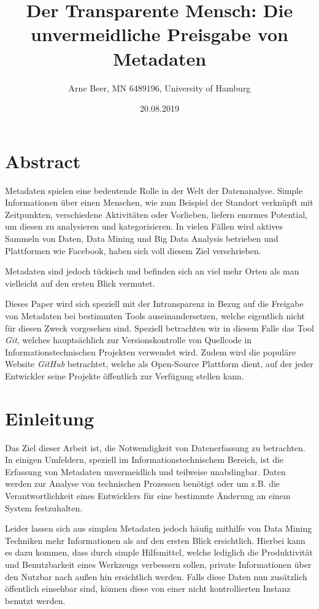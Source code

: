 \documentclass[12pt,a4paper]{scrartcl}
\begin{document}
\title{Der Transparente Mensch: Die unvermeidliche Preisgabe von Metadaten }
\author{Arne Beer, MN 6489196, University of Hamburg}
\date{20.08.2019}

\maketitle


\section{Abstract}

Metadaten spielen eine bedeutende Rolle in der Welt der Datenanalyse.
Simple Informationen über einen Menschen, wie zum Beispiel der Standort verknüpft mit Zeitpunkten, verschiedene Aktivitäten oder Vorlieben, liefern enormes Potential, um diesen zu analysieren und kategorisieren.
In vielen Fällen wird aktives Sammeln von Daten, Data Mining und Big Data Analysis betrieben und Plattformen wie Facebook, haben sich voll diesem Ziel verschrieben.

Metadaten sind jedoch tückisch und befinden sich an viel mehr Orten als man vielleicht auf den ersten Blick vermutet.

Dieses Paper wird sich speziell mit der Intransparenz in Bezug auf die Freigabe von Metadaten bei bestimmten Tools auseinandersetzen, welche eigentlich nicht für diesen Zweck vorgesehen sind.
Speziell betrachten wir in diesem Falle das Tool \emph{Git}, welches hauptsächlich zur Versionskontrolle von Quellcode in Informationstechnischen Projekten verwendet wird.
Zudem wird die populäre Website \emph{GitHub} betrachtet, welche als Open-Source Plattform dient, auf der jeder Entwickler seine Projekte öffentlich zur Verfügung stellen kann.

\newpage

\section{Einleitung}
Das Ziel dieser Arbeit ist, die Notwendigkeit von Datenerfassung zu betrachten.
In einigen Umfeldern, speziell im Informationstechnischem Bereich, ist die Erfassung von Metadaten unvermeidlich und teilweise unabdingbar.
Daten werden zur Analyse von technischen Prozessen benötigt oder um z.B. die Verantwortlichkeit eines Entwicklers für eine bestimmte Änderung an einem System festzuhalten.

Leider lassen sich aus simplen Metadaten jedoch häufig mithilfe von Data Mining Techniken mehr Informationen als auf den ersten Blick ersichtlich.
Hierbei kann es dazu kommen, dass durch simple Hilfsmittel, welche lediglich die Produktivität und Benutzbarkeit eines Werkzeugs verbessern sollen, private Informationen über den Nutzbar nach außen hin ersichtlich werden.
Falls diese Daten nun zusätzlich öffentlich einsehbar sind, können diese von einer nicht kontrollierten Instanz benutzt werden.
\end{document}
